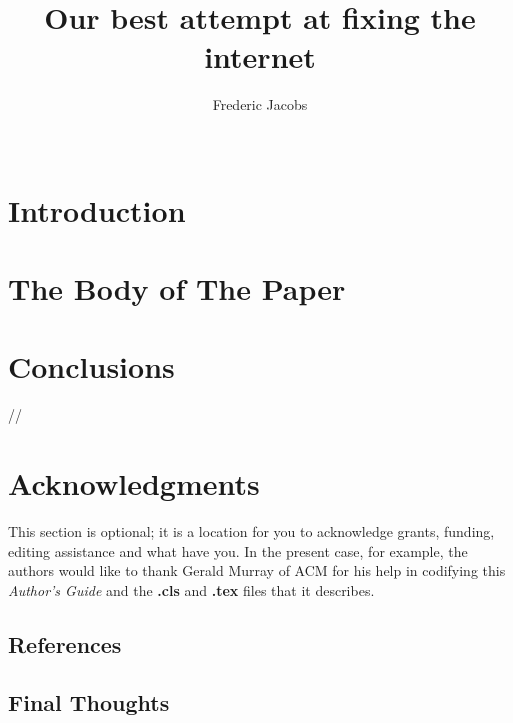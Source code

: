 \documentclass{vldb}
\begin{document}
\title{Our best attempt at fixing the internet}



\author{
\alignauthor
Frederic Jacobs\\
       \\
}

\maketitle

\begin{abstract}

\end{abstract}

\section{Introduction}
\section{The {\secit Body} of The Paper}
\section{Conclusions}

//\balance

\section{Acknowledgments}
This section is optional; it is a location for you
to acknowledge grants, funding, editing assistance and
what have you.  In the present case, for example, the
authors would like to thank Gerald Murray of ACM for
his help in codifying this \textit{Author's Guide}
and the \textbf{.cls} and \textbf{.tex} files that it describes.



\subsection{References}

\begin{appendix}

\section{Final Thoughts}

\end{appendix}
\end{document}
